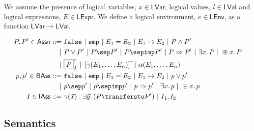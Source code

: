 We assume the presence of logical variables, $x \in \mathsf{LVar}$, logical values, $l \in \mathsf{LVal}$ and logical expressions, $E \in \mathsf{LExpr}$. We define a logical environment, $e \in \mathsf{LEnv}$, as a function $\mathsf{LVar} \rightarrow \mathsf{LVal}$.

\begin{align*}
P, P' \in \mathsf{Assn} ::=&
\ \mathtt{false}\
|\ \mathtt{emp}\
|\ E_1 = E_2\
|\ E_1 \mapsto E_2\
|\ P \land P' \\
|&\ P \lor P'\
|\ P \sep P'\
|\ P \sepimp P'\
|\ P \Rightarrow P'\
|\ \exists x \ldotp P\
|\ \circledast x \ldotp P \\
|&\ \boxed{P}^r_I\
|\ \left[ \gamma(E_1, \ldots, E_n) \right]^r
|\ \alpha(E_1, \ldots, E_n) \\
p, p' \in \mathsf{BAss} ::=&
\ \mathtt{false}\
|\ \mathtt{emp}\
|\ E_1 = E_2\
|\ E_1 \mapsto E_2\
|\ p \lor p' \\
|&\ p \sep p'\
|\ p \sepimp p'\
|\ p \Rightarrow p'\
|\ \exists x \ldotp p\
|\ \circledast x \ldotp p \\
I \in \mathsf{IAss} ::=&
\ \gamma(\vec{x}): \exists \vec{y} \ldotp (P \transfersto P')\ |\ I_1, I_2 \\
\end{align*}

\iffalse
\subsection{Semantics}


